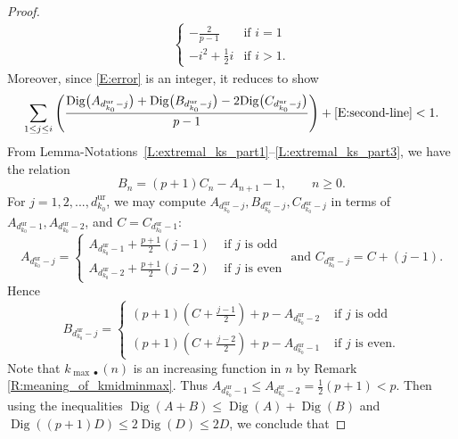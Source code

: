 \begin{proof}
    \begin{eqnarray}
    \label{E:second-line}
    \begin{cases}
    -\frac{2}{p-1} & \textrm{if $i=1$}\\
    -i^2+\tfrac12 i & \textrm{if $i>1$}.
    \end{cases}
    \end{eqnarray}
    Moreover, since \eqref{E:error} is an integer, it reduces to show
    \begin{equation}
    \label{E:main-est}
    \displaystyle \sum_{1 \leq j \leq i} \left( \frac{{\operatorname{Dig}}\big(A_{d_{k_0}^{\mathrm{ur}}- j}\big) +{\operatorname{Dig}}\big(B_{d_{k_0}^{\mathrm{ur}}- j}\big) - 2 {\operatorname{Dig}}\big(C_{d_{k_0}^{\mathrm{ur}}- j}\big)}{p-1}\right) + \eqref{E:second-line}<1.
    \end{equation}
    From Lemma-Notations~\ref{L:extremal_ks_part1}--\ref{L:extremal_ks_part3}, we have the relation
    \[
    B_n = (p+1) C_n - A_{n+1}-1, \qquad n\geq0.
    \]
    For $j=1,2,...,d^{\mathrm{ur}}_{k_0}$, we may compute $A_{d_{k_0}^{\mathrm{ur}}- j},B_{d_{k_0}^{\mathrm{ur}}- j},C_{d_{k_0}^{\mathrm{ur}}- j}$ in terms of $A_{d_{k_0}^{\mathrm{ur}}- 1},A_{d_{k_0}^{\mathrm{ur}}- 2}$, and $C= C_{d_{k_0}^{\mathrm{ur}}- 1}:$
    \begin{equation*}
    \label{E:A_n_and_C_n}
    A_{d_{k_0}^{\mathrm{ur}}- j} =
    \begin{cases}
    A_{d_{k_0}^{\mathrm{ur}}-1}+ \frac{p+1}{2} (j-1) & \textrm{ if } j \textrm{ is odd}
    \\
    A_{d_{k_0}^{\mathrm{ur}}-2} +\frac{p+1}{2}(j-2) & \textrm{ if } j \textrm{ is even}
    \end{cases}
    \textrm {    and  }C_{d_{k_0}^{\mathrm{ur}}- j} = C+ (j-1).
    \end{equation*}
    Hence
    \begin{equation*}
     B_{d_{k_0}^{\mathrm{ur}}- j} =
    \begin{cases}
    (p+1)(C+\frac{j-1}{2})+p- A_{d_{k_0}^{\mathrm{ur}}-2} &  \textrm{ if } j \textrm{ is odd}
    \\
    (p+1)(C+\frac{j-2}{2})+p- A_{d_{k_0}^{\mathrm{ur}}-1} & \textrm{ if } j \textrm{ is even}.
    \end{cases}
    \end{equation*}
    Note that $k_{\max\bullet}(n)$ is an increasing function in $n$ by Remark \ref{R:meaning_of_kmidminmax}.  Thus $A_{d_{k_0}^{\mathrm{ur}}-1}\leq A_{d_{k_0}^{\mathrm{ur}}-2}=\tfrac 12(p+1)<p$. Then using the inequalities ${\operatorname{Dig}}(A+B)\leq{\operatorname{Dig}}(A) + {\operatorname{Dig}}(B)  $ and ${\operatorname{Dig}}((p+1)D)\leq 2{\operatorname{Dig}}(D) \leq 2D$, we conclude that

\end{proof}
